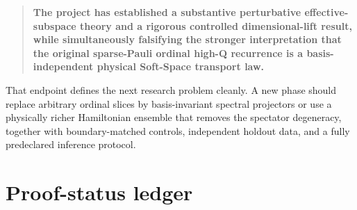 \documentclass[11pt,a4paper]{article}
\begin{document}
\begin{quote}
\textbf{The project has established a substantive perturbative
effective-subspace theory and a rigorous controlled dimensional-lift result,
while simultaneously falsifying the stronger interpretation that the
original sparse-Pauli ordinal high-Q recurrence is a basis-independent
physical Soft-Space transport law.}
\end{quote}

That endpoint defines the next research problem cleanly.  A new phase should
replace arbitrary ordinal slices by basis-invariant spectral projectors or use
a physically richer Hamiltonian ensemble that removes the spectator
degeneracy, together with boundary-matched controls, independent holdout data,
and a fully predeclared inference protocol.

\appendix
\section{Proof-status ledger}
\end{document}
